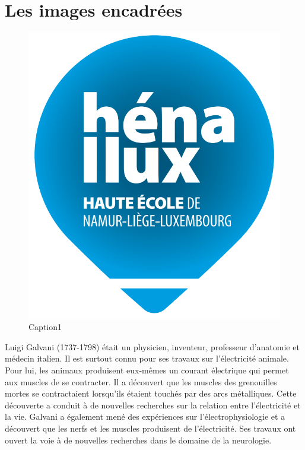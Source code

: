 \documentclass{rapportHenallux}
\begin{document}
\section{Les images encadrées}
\begin{figure}
\includegraphics[width=0.9\linewidth]{images/logo_henallux.png} 
\caption{Caption1}
\label{fig:wrapfig}
\end{figure}
Luigi Galvani (1737-1798) était un physicien, inventeur, professeur d’anatomie et médecin italien. Il est surtout connu pour ses travaux sur l’électricité animale. Pour lui, les animaux produisent eux-mêmes un courant électrique qui permet aux muscles de se contracter. Il a découvert que les muscles des grenouilles mortes se contractaient lorsqu’ils étaient touchés par des arcs métalliques. Cette découverte a conduit à de nouvelles recherches sur la relation entre l’électricité et la vie. Galvani a également mené des expériences sur l’électrophysiologie et a découvert que les nerfs et les muscles produisent de l’électricité. Ses travaux ont ouvert la voie à de nouvelles recherches dans le domaine de la neurologie.
\end{document}
